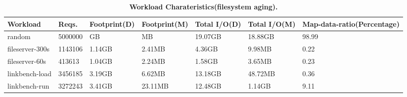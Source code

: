 \begin{table}[tb]
    \centering
    \fontsize{11}{11}
    \small

    \begin{tabular}{|l|l|l|l|l|l|l|}
		\hline
		\bf{Workload} & \bf{Reqs.} & \bf{Footprint(D)} & \bf{Footprint(M)} & \bf{Total I/O(D)} &\bf{Total I/O(M)} &\bf{Map-data-ratio(Percentage)} \\ \hline \hline
		random & 5000000 & GB & MB & 19.07GB & 18.88GB & 98.99\\ \hline 		
		fileserver-300s & 1143106 & 1.14GB & 2.41MB & 4.36GB & 9.98MB & 0.22\\ \hline 		
		fileserver-60s & 413613 & 1.04GB & 2.24MB & 1.58GB & 3.65MB & 0.23\\ \hline 		
		linkbench-load & 3456185 & 3.19GB & 6.62MB & 13.18GB & 48.72MB & 0.36\\ \hline 		
		linkbench-run & 3272243 & 3.41GB & 23.11MB & 12.48GB & 1.14GB & 9.11\\ \hline 		
    \end{tabular}
    \caption{\textbf{Workload Charateristics(filesystem aging).}}
    \label{fs_aging} 
\end{table}	

